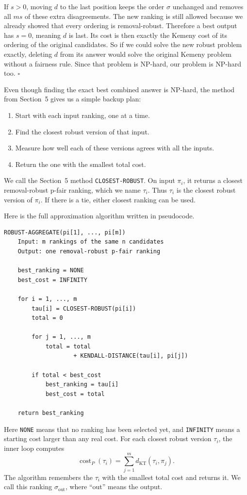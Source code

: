 \documentclass[11pt]{article}
\newcommand{\KT}{d_{\mathrm{KT}}}
\begin{document}
If $s>0$, moving $d$ to the last position keeps the order $\sigma$ unchanged
and removes all $ms$ of these extra disagreements.  The new ranking is still
allowed because we already showed that every ordering is removal-robust.
Therefore a best output has $s=0$, meaning $d$ is last.  Its cost is then
exactly the Kemeny cost of its ordering of the original candidates.
So if we could solve the new robust problem exactly, deleting $d$ from its
answer would solve the original Kemeny problem without a fairness rule.  Since
that problem is NP-hard, our problem is NP-hard too.
\hfill\(\square\)

Even though finding the exact best combined answer is NP-hard, the method from
Section~5 gives us a simple backup plan:

\begin{enumerate}
  \item Start with each input ranking, one at a time.
  \item Find the closest robust version of that input.
  \item Measure how well each of these versions agrees with all the inputs.
  \item Return the one with the smallest total cost.
\end{enumerate}

We call the Section~5 method \texttt{CLOSEST-ROBUST}.  On input $\pi_i$, it
returns a closest removal-robust p-fair ranking, which we name $\tau_i$.  Thus
$\tau_i$ is the closest robust version of $\pi_i$.  If there is a tie, either
closest ranking can be used.

Here is the full approximation algorithm written in pseudocode.

\begin{verbatim}
ROBUST-AGGREGATE(pi[1], ..., pi[m])
    Input: m rankings of the same n candidates
    Output: one removal-robust p-fair ranking

    best_ranking = NONE
    best_cost = INFINITY

    for i = 1, ..., m
        tau[i] = CLOSEST-ROBUST(pi[i])
        total = 0

        for j = 1, ..., m
            total = total
                    + KENDALL-DISTANCE(tau[i], pi[j])

        if total < best_cost
            best_ranking = tau[i]
            best_cost = total

    return best_ranking
\end{verbatim}

Here \texttt{NONE} means that no ranking has been selected yet, and
\texttt{INFINITY} means a starting cost larger than any real cost.  For each
closest robust version $\tau_i$, the inner loop computes
\[
 \operatorname{cost}_P(\tau_i)
 =\sum_{j=1}^{m}\KT(\tau_i,\pi_j).
\]
The algorithm remembers the $\tau_i$ with the smallest total cost and returns
it.  We call this ranking $\sigma_{\mathrm{out}}$, where ``out'' means the
output.
\end{document}
